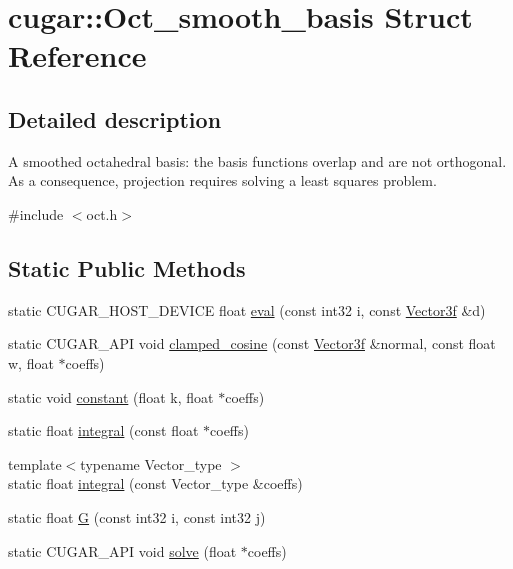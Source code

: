 \hypertarget{structcugar_1_1_oct__smooth__basis}{}\section{cugar\+:\+:Oct\+\_\+smooth\+\_\+basis Struct Reference}
\label{structcugar_1_1_oct__smooth__basis}


\subsection{Detailed description}
A smoothed octahedral basis\+: the basis functions overlap and are not orthogonal. As a consequence, projection requires solving a least squares problem. 

{\ttfamily \#include $<$oct.\+h$>$}

\subsection*{Static Public Methods}
\begin{DoxyCompactItemize}
\item 
static C\+U\+G\+A\+R\+\_\+\+H\+O\+S\+T\+\_\+\+D\+E\+V\+I\+CE float \hyperlink{structcugar_1_1_oct__smooth__basis_a310ec19b1ced8812b5fe4f415a721773}{eval} (const int32 i, const \hyperlink{structcugar_1_1_vector}{Vector3f} \&d)
\item 
static C\+U\+G\+A\+R\+\_\+\+A\+PI void \hyperlink{structcugar_1_1_oct__smooth__basis_ac4eea8a92288ccfe69b7630de035c3a5}{clamped\+\_\+cosine} (const \hyperlink{structcugar_1_1_vector}{Vector3f} \&normal, const float w, float $\ast$coeffs)
\item 
static void \hyperlink{structcugar_1_1_oct__smooth__basis_aef676cab73d6b500f859ee03881ef59a}{constant} (float k, float $\ast$coeffs)
\item 
static float \hyperlink{structcugar_1_1_oct__smooth__basis_afdbf96838ebf4a79dfbbde82566ef711}{integral} (const float $\ast$coeffs)
\item 
{\footnotesize template$<$typename Vector\+\_\+type $>$ }\\static float \hyperlink{structcugar_1_1_oct__smooth__basis_ac946455effe71333ecd1bfe51868196d}{integral} (const Vector\+\_\+type \&coeffs)
\item 
static float \hyperlink{structcugar_1_1_oct__smooth__basis_ac7edf7dee897a7a8b6fc204f83c90a70}{G} (const int32 i, const int32 j)
\item 
static C\+U\+G\+A\+R\+\_\+\+A\+PI void \hyperlink{structcugar_1_1_oct__smooth__basis_afae1fc0e9cb48f9f7e938830fb74b8e1}{solve} (float $\ast$coeffs)
\end{DoxyCompactItemize}

